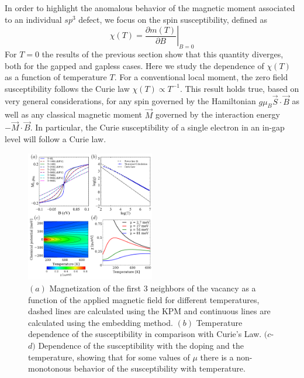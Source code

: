 \documentclass[aps,prb,twocolumn,superscriptaddress]{revtex4-1}
\begin{document}
In order to highlight the anomalous behavior of the magnetic  moment associated to an individual $sp^3$ defect, we focus on the spin susceptibility, defined as
\begin{equation}
  \chi(T) = \left.\frac{\partial m (T)}{\partial B}\right|_{B=0}
\label{susceptibility}
\end{equation}
For $T=0$ the results of the previous section show that this quantity diverges, both for the gapped and gapless cases. Here we study the dependence of $\chi(T)$ as a function of temperature $T$. For a conventional local moment,  the zero field susceptibility follows the Curie law $\chi(T) \propto T^{-1}$. This result holds true, based on very general considerations, for any spin governed by the Hamiltonian $g\mu_B  \vec{S}\cdot\vec{B}$ as well as any classical magnetic moment $\vec{M}$ governed by the interaction energy $-\vec{M}\cdot\vec{B}$. In particular, the Curie susceptibility of a single electron in an in-gap level will follow a Curie law.

\begin{figure}[t!]
  \centering
  \includegraphics[width=0.5\textwidth]{temp_sus.pdf}
  \caption{$(a)$ Magnetization of the first 3 neighbors of the vacancy as a
    function of the applied magnetic field for different temperatures, dashed lines are calculated using the KPM and continuous lines are calculated using the embedding method. $(b)$ Temperature dependence of the susceptibility in comparison with Curie's Law. $(c$-$d)$ Dependence of the susceptibility with the doping and the temperature, showing that for some values of $\mu$ there is a non-monotonous behavior of the susceptibility with temperature.}
  \label{mag_temp}
\end{figure}
\end{document}
